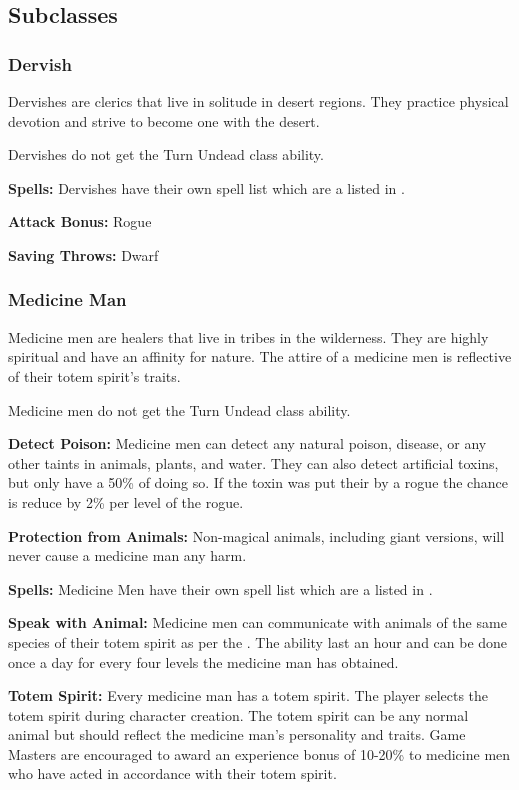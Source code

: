 \begin{multicols*}{2}
\subsection{Subclasses}
\subsubsection{Dervish}
Dervishes are clerics that live in solitude in desert regions. They practice physical devotion and strive to become one with the desert.

Dervishes do not get the Turn Undead class ability.

\textbf{Spells:} Dervishes have their own spell list which are a listed in .

\textbf{Attack Bonus:} Rogue

\textbf{Saving Throws:} Dwarf

\subsubsection{Medicine Man}
Medicine men are healers that live in tribes in the wilderness. They are highly spiritual and have an affinity for nature. The attire of a medicine men is reflective of their totem spirit's traits.

Medicine men do not get the Turn Undead class ability.

\textbf{Detect Poison:} Medicine men can detect any natural poison, disease, or any other taints in animals, plants, and water. They can also detect artificial toxins, but only have a 50\% of doing so. If the toxin was put their by a rogue the chance is reduce by 2\% per level of the rogue.

\textbf{Protection from Animals:} Non-magical animals, including giant versions, will never cause a medicine man any harm.

\textbf{Spells:} Medicine Men have their own spell list which are a listed in .

\textbf{Speak with Animal:} Medicine men can communicate with animals  of the same species of their totem spirit as per the . The ability last an hour and can be done once a day for every four levels the medicine man has obtained.

\textbf{Totem Spirit:} Every medicine man has a totem spirit. The player selects the totem spirit during character creation. The totem spirit can be any normal animal but should reflect the medicine man's personality and traits. Game Masters are encouraged to award an experience bonus of 10-20\% to medicine men who have acted in accordance with their totem spirit.


\end{multicols*}
